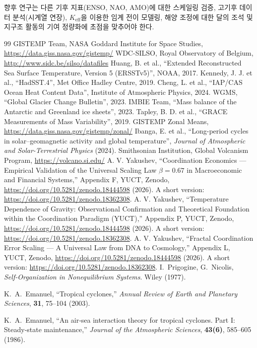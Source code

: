 \documentclass[11pt,a4paper]{article}
\newcommand{\Keff}{K_{\mathrm{eff}}}
\begin{document}
	향후 연구는 다른 기후 지표(ENSO, NAO, AMO)에 대한 스케일링 검증, 고기후 데이터 분석(시계열 연장), $\Keff$을 이용한 임계 전이 모델링, 해양 조정에 대한 달의 조석 및 지구조 활동의 기여 정량화에 초점을 맞추어야 한다.
	
	\begin{thebibliography}{99}
		 GISTEMP Team, NASA Goddard Institute for Space Studies, \url{https://data.giss.nasa.gov/gistemp/}
		 WDC-SILSO, Royal Observatory of Belgium, \url{http://www.sidc.be/silso/datafiles}
		 Huang, B. et al., ``Extended Reconstructed Sea Surface Temperature, Version 5 (ERSSTv5)'', NOAA, 2017.
		 Kennedy, J. J. et al., ``HadSST.4'', Met Office Hadley Centre, 2019.
		 Cheng, L. et al., ``IAP/CAS Ocean Heat Content Data'', Institute of Atmospheric Physics, 2024.
		 WGMS, ``Global Glacier Change Bulletin'', 2023.
		 IMBIE Team, ``Mass balance of the Antarctic and Greenland ice sheets'', 2023.
		 Tapley, B. D. et al., ``GRACE Measurements of Mass Variability'', 2019.
		 GISTEMP Zonal Means, \url{https://data.giss.nasa.gov/gistemp/zonal/}
		 Ibanga, E. et al., ``Long-period cycles in solar–geomagnetic activity and global temperature'', \emph{Journal of Atmospheric and Solar-Terrestrial Physics} (2024).
		 Smithsonian Institution, Global Volcanism Program, \url{https://volcano.si.edu/}
		 A. V. Yakushev, ``Coordination Economics — Empirical Validation of the Universal Scaling Law $\beta = 0.67$ in Macroeconomic and Financial Systems,'' Appendix F, YUCT, Zenodo, \url{https://doi.org/10.5281/zenodo.18444598} (2026). A short version: \url{https://doi.org/10.5281/zenodo.18362308}.
		 A. V. Yakushev, ``Temperature Dependence of Gravity: Observational Confirmation and Theoretical Foundation within the Coordination Paradigm (YUCT),'' Appendix P, YUCT, Zenodo, \url{https://doi.org/10.5281/zenodo.18444598} (2026). A short version: \url{https://doi.org/10.5281/zenodo.18362308}.
		 A. V. Yakushev, ``Fractal Coordination Error Scaling — A Universal Law from DNA to Cosmology,'' Appendix L, YUCT, Zenodo, \url{https://doi.org/10.5281/zenodo.18444598} (2026). A short version: \url{https://doi.org/10.5281/zenodo.18362308}.
		I.~Prigogine, G.~Nicolis, \emph{Self‑Organization in Nonequilibrium Systems}. Wiley (1977).
		
		K.~A.~Emanuel, ``Tropical cyclones,'' \emph{Annual Review of Earth and Planetary Sciences},
		\textbf{31}, 75--104 (2003).
		
		K.~A.~Emanuel, ``An air‑sea interaction theory for tropical cyclones. Part I:
		Steady‑state maintenance,'' \emph{Journal of the Atmospheric Sciences},
		\textbf{43(6)}, 585--605 (1986).
	\end{thebibliography}
	
\end{document}
